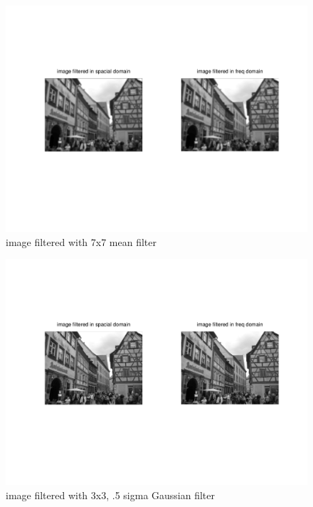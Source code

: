 \documentclass{article}
\begin{document}
	\begin{figure}[H]
		\includegraphics[width=\linewidth]{Q7/partB1.png}
		\caption{image filtered with 7x7 mean filter}
	\end{figure}
	\begin{figure}[H]
		\includegraphics[width=\linewidth]{Q7/partB2.png}
		\caption{image filtered with 3x3, .5 sigma Gaussian filter}
	\end{figure}
\end{document}
